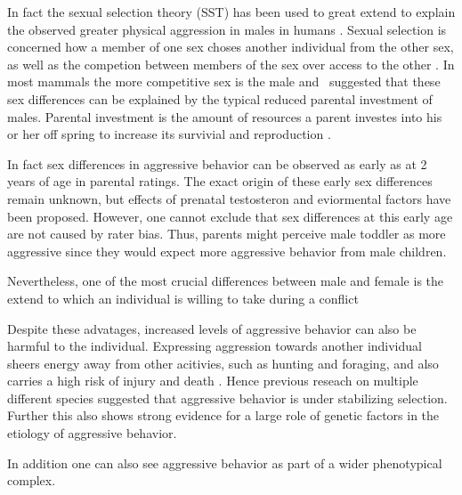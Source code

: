 In fact the sexual selection theory (SST) has been used to great extend to explain the observed greater physical aggression in males in humans \cite{Archer2004}. 
Sexual selection is concerned how a member of one sex choses another individual from the other sex, as well as the competion between members of the sex over access to the other \cite{Darwin1859}.
In most mammals the more competitive sex is the male \cite{Archer2009} and~\cite{Trivers1972} suggested that these sex differences can be explained by the typical reduced parental investment of males.
Parental investment is the amount of resources a parent investes into his or her off spring to increase its survivial and reproduction \cite{Archer2009}.

In fact sex differences in aggressive behavior can be observed as early as at 2 years of age in parental ratings.
The exact origin of these early sex differences remain unknown, but effects of prenatal testosteron and eviormental factors have been proposed.
However, one cannot exclude that sex differences at this early age are not caused by rater bias. %
Thus, parents might perceive male toddler as more aggressive since they would expect more aggressive behavior from male children.

Nevertheless, one of the most crucial differences between male and female is the extend to which an individual is willing to take during a conflict %



Despite these advatages, increased levels of aggressive behavior can also be harmful to the individual.
Expressing aggression towards another individual sheers energy away from other acitivies, such as hunting and foraging, and also carries a high risk of injury and death \cite{Packer1995}.  
Hence previous reseach on multiple different species suggested that aggressive behavior is under stabilizing selection.
Further this also shows strong evidence for a large role of genetic factors in the etiology of aggressive behavior. 


In addition one can also see aggressive behavior as part of a wider phenotypical complex. 


